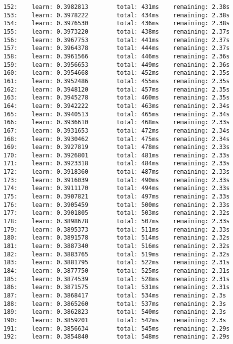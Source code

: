 \documentclass[11pt]{article}
\begin{document}
\begin{Verbatim}[commandchars=\\\{\}]
152:    learn: 0.3982813        total: 431ms    remaining: 2.38s
153:    learn: 0.3978222        total: 434ms    remaining: 2.38s
154:    learn: 0.3976530        total: 436ms    remaining: 2.38s
155:    learn: 0.3973220        total: 438ms    remaining: 2.37s
156:    learn: 0.3967753        total: 441ms    remaining: 2.37s
157:    learn: 0.3964378        total: 444ms    remaining: 2.37s
158:    learn: 0.3961566        total: 446ms    remaining: 2.36s
159:    learn: 0.3956653        total: 449ms    remaining: 2.36s
160:    learn: 0.3954668        total: 452ms    remaining: 2.35s
161:    learn: 0.3952486        total: 455ms    remaining: 2.35s
162:    learn: 0.3948120        total: 457ms    remaining: 2.35s
163:    learn: 0.3945278        total: 460ms    remaining: 2.35s
164:    learn: 0.3942222        total: 463ms    remaining: 2.34s
165:    learn: 0.3940513        total: 465ms    remaining: 2.34s
166:    learn: 0.3936610        total: 468ms    remaining: 2.33s
167:    learn: 0.3931653        total: 472ms    remaining: 2.34s
168:    learn: 0.3930462        total: 475ms    remaining: 2.34s
169:    learn: 0.3927819        total: 478ms    remaining: 2.33s
170:    learn: 0.3926801        total: 481ms    remaining: 2.33s
171:    learn: 0.3923318        total: 484ms    remaining: 2.33s
172:    learn: 0.3918360        total: 487ms    remaining: 2.33s
173:    learn: 0.3916039        total: 490ms    remaining: 2.33s
174:    learn: 0.3911170        total: 494ms    remaining: 2.33s
175:    learn: 0.3907821        total: 497ms    remaining: 2.33s
176:    learn: 0.3905459        total: 500ms    remaining: 2.33s
177:    learn: 0.3901805        total: 503ms    remaining: 2.32s
178:    learn: 0.3898678        total: 507ms    remaining: 2.33s
179:    learn: 0.3895373        total: 511ms    remaining: 2.33s
180:    learn: 0.3891578        total: 514ms    remaining: 2.32s
181:    learn: 0.3887340        total: 516ms    remaining: 2.32s
182:    learn: 0.3883765        total: 519ms    remaining: 2.32s
183:    learn: 0.3881795        total: 522ms    remaining: 2.31s
184:    learn: 0.3877750        total: 525ms    remaining: 2.31s
185:    learn: 0.3874539        total: 528ms    remaining: 2.31s
186:    learn: 0.3871575        total: 531ms    remaining: 2.31s
187:    learn: 0.3868417        total: 534ms    remaining: 2.3s
188:    learn: 0.3865260        total: 537ms    remaining: 2.3s
189:    learn: 0.3862823        total: 540ms    remaining: 2.3s
190:    learn: 0.3859201        total: 542ms    remaining: 2.3s
191:    learn: 0.3856634        total: 545ms    remaining: 2.29s
192:    learn: 0.3854840        total: 548ms    remaining: 2.29s

\end{Verbatim}
\end{document}
